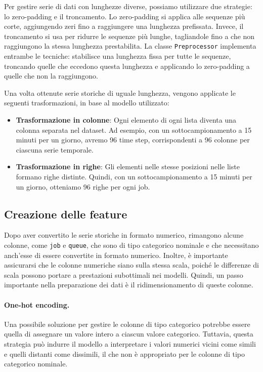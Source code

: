 Per gestire serie di dati con lunghezze diverse, possiamo utilizzare due
strategie: lo zero-padding e il troncamento. Lo zero-padding si applica alle
sequenze più corte, aggiungendo zeri fino a raggiungere una lunghezza
prefissata. Invece, il troncamento si usa per ridurre le sequenze più lunghe,
tagliandole fino a che non raggiungono la stessa lunghezza prestabilita. La
classe \texttt{Preprocessor} implementa entrambe le tecniche: stabilisce una
lunghezza fissa per tutte le sequenze, troncando quelle che eccedono questa
lunghezza e applicando lo zero-padding a quelle che non la raggiungono.

Una volta ottenute serie storiche di uguale lunghezza, vengono applicate le
seguenti trasformazioni, in base al modello utilizzato:

\begin{itemize}
    \item \textbf{Trasformazione in colonne}: Ogni elemento di ogni lista diventa una colonna
        separata nel dataset. Ad esempio, con un sottocampionamento a 15
        minuti per un giorno, avremo 96 time step, corrispondenti a 96 colonne
        per ciascuna serie temporale.
    \item \textbf{Trasformazione in righe}: 
        Gli elementi nelle stesse posizioni nelle liste formano righe
        distinte. Quindi, con un sottocampionamento a 15 minuti per un giorno,
        otteniamo 96 righe per ogni job.
\end{itemize}

\subsection{Creazione delle feature}

Dopo aver convertito le serie storiche in formato numerico, rimangono alcune
colonne, come \texttt{job} e \texttt{queue}, che sono di tipo categorico
nominale e che necessitano anch'esse di essere convertite in formato numerico.
Inoltre, è importante assicurarsi che le colonne numeriche siano sulla stessa
scala, poiché le differenze di scala possono portare a prestazioni subottimali
nei modelli. Quindi, un passo importante nella preparazione dei dati è il
ridimensionamento di queste colonne.

\paragraph{One-hot encoding.} 
\label{par:features}

Una possibile soluzione per gestire le colonne di tipo categorico potrebbe
essere quella di assegnare un valore intero a ciascun valore categorico.
Tuttavia, questa strategia può indurre il modello a interpretare i valori
numerici vicini come simili e quelli distanti come dissimili, il che non è
appropriato per le colonne di tipo categorico nominale.

